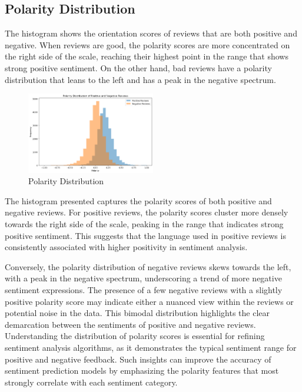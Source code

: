 \documentclass[11pt,a4paper]{article}
\begin{document}
\subsection{Polarity Distribution}
The histogram shows the orientation scores of reviews that are both positive and negative. When reviews are good, the polarity scores are more concentrated on the right side of the scale, reaching their highest point in the range that shows strong positive sentiment. On the other hand, bad reviews have a polarity distribution that leans to the left and has a peak in the negative spectrum. 
\begin{figure}[ht]
    \centering
    \includegraphics[width=0.5\textwidth]{1.png}
    \caption{Polarity Distribution}
    \label{fig:polarity_distribution}
\end{figure}


The histogram presented captures the polarity scores of both positive and negative reviews. For positive reviews, the polarity scores cluster more densely towards the right side of the scale, peaking in the range that indicates strong positive sentiment. This suggests that the language used in positive reviews is consistently associated with higher positivity in sentiment analysis.

Conversely, the polarity distribution of negative reviews skews towards the left, with a peak in the negative spectrum, underscoring a trend of more negative sentiment expressions. The presence of a few negative reviews with a slightly positive polarity score may indicate either a nuanced view within the reviews or potential noise in the data.
This bimodal distribution highlights the clear demarcation between the sentiments of positive and negative reviews. Understanding the distribution of polarity scores is essential for refining sentiment analysis algorithms, as it demonstrates the typical sentiment range for positive and negative feedback. Such insights can improve the accuracy of sentiment prediction models by emphasizing the polarity features that most strongly correlate with each sentiment category.
\end{document}
